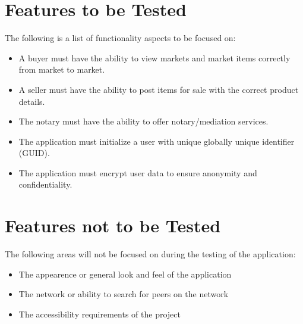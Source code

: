\documentclass{article}
\begin{document}
\section*{Features to be Tested}
The following is a list of functionality aspects to be focused on:
\newline
\begin{itemize}
 \item
A buyer must have the ability to view markets and market items correctly from market to market.
 \item
A seller must have the ability to post items for sale with the correct product details.
 \item
The notary must have the ability to offer notary/mediation services.
\item
The application must initialize a user with unique globally unique identifier (GUID).
\item
The application must encrypt user data to ensure anonymity and confidentiality.
\end{itemize}

\section*{Features not to be Tested}
The following areas will not be focused on during the testing of the application:
\newline
\begin{itemize}
 \item
The appearence or general look and feel of the application
 \item
The network or ability to search for peers on the network
\item
The accessibility requirements of the project
\end{itemize}

\end{document}
